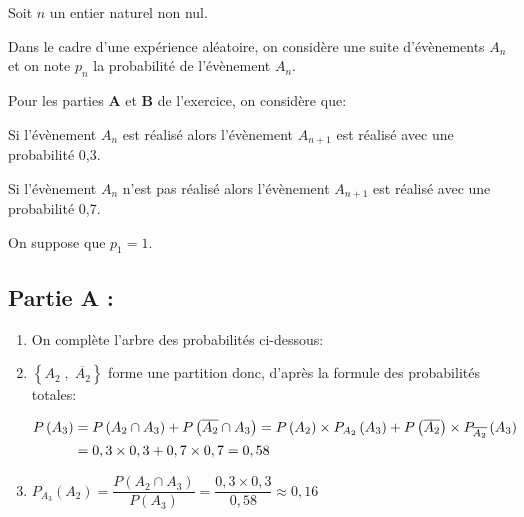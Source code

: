 
Soit $n$ un entier naturel non nul.

Dans le cadre d'une expérience aléatoire, on considère une suite d'évènements $A_{n}$ et on note $p_{n}$ la probabilité de l'évènement $A_{n}$.

\begin{list}{\textbullet}{Pour les parties \textbf{A} et \textbf{B} de l'exercice, on considère que:}
\item Si l'évènement $A_{n}$ est réalisé alors l'évènement $A_{n+1}$ est réalisé avec une probabilité 0,3.
\item Si l'évènement $A_{n}$ n'est pas réalisé alors l'évènement $A_{n+1}$ est réalisé avec une probabilité 0,7.
\end{list}

On suppose que $p_{1}=1$.

\subsection*{Partie A :}

\begin{enumerate}
\item On complète l'arbre des probabilités ci-dessous:

\begin{center}
\bigskip
{}%
{
	{
	}
	{
	}
}
\bigskip
\end{center}

\item %
$\left \{ A_2\;,\; \overline{A_2} \right \}$ forme une partition donc, d'après la formule des probabilités totales:

$\aligned
P\left (A_3\right )
& = P\left (A_2 \cap A_3\right ) +P\left (\overline{A_2} \cap A_3\right )
= P\left (A_2\right ) \times P_{A_2}\left (A_3\right ) + P\left (\overline{ A_2} \right ) \times P_{\overline{ A_2} }\left (A_3\right )\\
& = 0,3\times 0,3+0,7\times 0,7 = 0,58
\endaligned$

\item %
$P_{A_{3}}\left(A_{2}\right) = \dfrac{P\left (A_2 \cap A_3\right )}{P\left ( A_3\right )}
= \dfrac{0,3\times 0,3}{0,58}\approx 0,16$
\end{enumerate}


